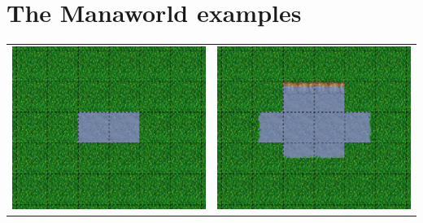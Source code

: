 \newpage
\section{The Manaworld examples}
\begin{table}
		\begin{tabular}{c c}
		\includegraphics[scale=1]{Example/TheManaWorld/flow1.eps} &
	    \includegraphics[scale=1]{Example/TheManaWorld/flow2.eps} \\

\end{tabular}
\end{table}
